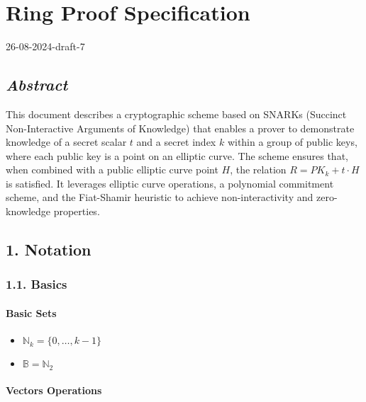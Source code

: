\documentclass[
]{article}
\author{}
\date{}
\providecommand{\tightlist}{%
  \setlength{\itemsep}{0pt}\setlength{\parskip}{0pt}}
\begin{document}
\hypertarget{ring-proof-specification}{%
\section{Ring Proof Specification}\label{ring-proof-specification}}

26-08-2024-draft-7

\hypertarget{abstract}{%
\subsection{\texorpdfstring{\emph{Abstract}}{Abstract}}\label{abstract}}

This document describes a cryptographic scheme based on SNARKs (Succinct
Non-Interactive Arguments of Knowledge) that enables a prover to
demonstrate knowledge of a secret scalar \(t\) and a secret index \(k\)
within a group of public keys, where each public key is a point on an
elliptic curve. The scheme ensures that, when combined with a public
elliptic curve point \(H\), the relation \(R = PK_k + t·H\) is
satisfied. It leverages elliptic curve operations, a polynomial
commitment scheme, and the Fiat-Shamir heuristic to achieve
non-interactivity and zero-knowledge properties.

\hypertarget{notation}{%
\subsection{1. Notation}\label{notation}}

\hypertarget{basics}{%
\subsubsection{1.1. Basics}\label{basics}}

\hypertarget{basic-sets}{%
\paragraph{Basic Sets}\label{basic-sets}}

\begin{itemize}
\tightlist
\item
  \(\mathbb{N}_k = \{0, \dots, k-1\}\)
\item
  \(\mathbb{B} = \mathbb{N}_2\)
\end{itemize}

\hypertarget{vectors-operations}{%
\paragraph{Vectors Operations}\label{vectors-operations}}
\end{document}
